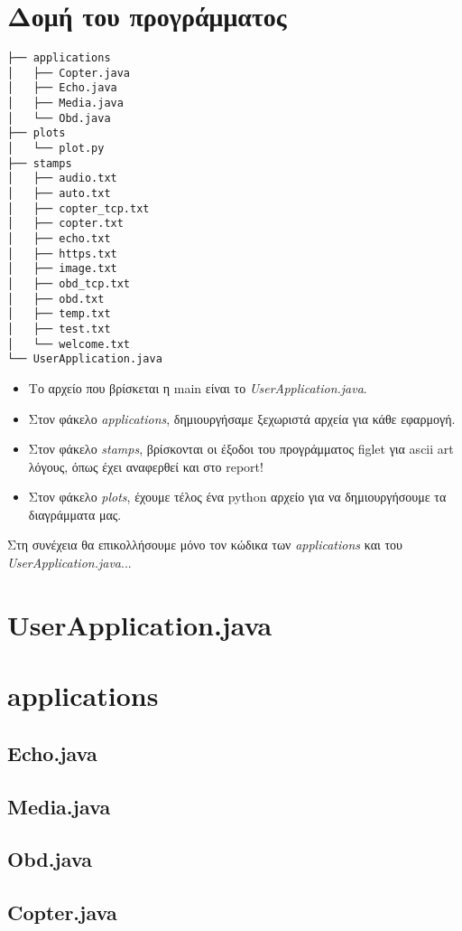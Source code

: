 \documentclass[hidelinks, 12pt, a4paper]{article}
\begin{document}
\sloppy %




\pagebreak
\tableofcontents
\pagebreak


\section{Δομή του προγράμματος}

\vspace{1cm}

\begin{verbatim}
├── applications
│   ├── Copter.java
│   ├── Echo.java
│   ├── Media.java
│   └── Obd.java
├── plots
│   └── plot.py
├── stamps
│   ├── audio.txt
│   ├── auto.txt
│   ├── copter_tcp.txt
│   ├── copter.txt
│   ├── echo.txt
│   ├── https.txt
│   ├── image.txt
│   ├── obd_tcp.txt
│   ├── obd.txt
│   ├── temp.txt
│   ├── test.txt
│   └── welcome.txt
└── UserApplication.java
\end{verbatim}


\begin{itemize}
    \item Το αρχείο που βρίσκεται η main είναι το \emph{UserApplication.java}.
    \item Στον φάκελο \emph{applications}, δημιουργήσαμε ξεχωριστά αρχεία για κάθε εφαρμογή.
    \item Στον φάκελο \emph{stamps}, βρίσκονται οι έξοδοι του προγράμματος figlet για ascii art λόγους, όπως έχει αναφερθεί και στο report!
    \item Στον φάκελο \emph{plots}, έχουμε τέλος ένα python αρχείο για να δημιουργήσουμε τα διαγράμματα μας.
\end{itemize}

Στη συνέχεια θα επικολλήσουμε μόνο τον κώδικα των \emph{applications} και του \emph{UserApplication.java}...

\pagebreak

\section{UserApplication.java}

\section{applications}

\subsection{Echo.java}
\subsection{Media.java}
\subsection{Obd.java}
\subsection{Copter.java}
\end{document}
